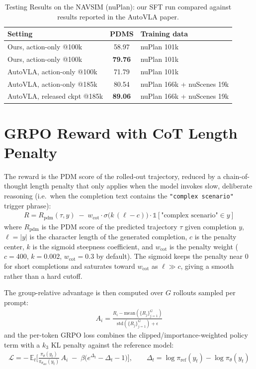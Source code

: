 \documentclass[11pt]{article}
\begin{document}
\begin{table}[t]
\centering
\begin{tabular}{lcl}
\toprule
Setting & PDMS & Training data \\
\midrule
Ours, action-only @100k             & 58.97 & nuPlan 101k \\
Ours, action-only @100k                 & \textbf{79.76} & nuPlan 101k \\
AutoVLA, action-only @100k   & 71.79     & nuPlan 101k \\
AutoVLA, action-only @185k   & 80.54  & nuPlan 166k + nuScenes 19k \\
AutoVLA, released ckpt @185k   & \textbf{89.06}  & nuPlan 166k + nuScenes 19k \\
\bottomrule
\end{tabular}
\caption{Testing Results on the NAVSIM (nuPlan): our SFT run compared
against results reported in the AutoVLA paper.}
\label{tab:pdms_comparison}
\end{table}

\section*{GRPO Reward with CoT Length Penalty}

The reward is the PDM score of the rolled-out trajectory, reduced by a
chain-of-thought length penalty that only applies when the model invokes
slow, deliberate reasoning (i.e.\ when the completion text contains the
\texttt{"complex scenario"} trigger phrase):
\begin{align*}
R = R_{\text{pdm}}(\tau, y) \;-\; w_{\text{cot}} \cdot
    \sigma\big(k \, (\ell - c)\big) \cdot \mathbb{1}[\text{"complex scenario"} \in y]
\end{align*}
where $R_{\text{pdm}}$ is the PDM score of the predicted trajectory $\tau$ given
completion $y$, $\ell = |y|$ is the character length of the generated
completion, $c$ is the penalty center, $k$ is the sigmoid steepness
coefficient, and $w_{\text{cot}}$ is the penalty weight
($c = 400$, $k = 0.002$, $w_{\text{cot}} = 0.3$ by default). The sigmoid keeps
the penalty near $0$ for short completions and saturates toward
$w_{\text{cot}}$ as $\ell \gg c$, giving a smooth rather than a hard cutoff.

The group-relative advantage is then computed over $G$ rollouts sampled per
prompt:
\begin{align*}
A_i = \frac{R_i - \mathrm{mean}(\{R_j\}_{j=1}^{G})}{\mathrm{std}(\{R_j\}_{j=1}^{G}) + \epsilon}
\end{align*}
and the per-token GRPO loss combines the clipped/importance-weighted policy
term with a $k_3$ KL penalty against the reference model:
\begin{align*}
\mathcal{L}
  = -\, \mathbb{E}_t \Big[
      \tfrac{\pi_\theta(y_t)}{\pi_{\theta_{\text{old}}}(y_t)} \, A_i
      \;-\; \beta \Big( e^{\Delta_t} - \Delta_t - 1 \Big)
    \Big], \qquad
\Delta_t = \log \pi_{\text{ref}}(y_t) - \log \pi_\theta(y_t)
\end{align*}
\end{document}
